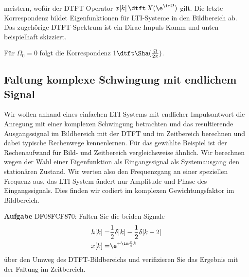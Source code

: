 meistern, wofür der DTFT-Operator $x[k] \,\dtft\, X(\e^{\im\Omega})$ gilt.
%
Die letzte Korrespondenz bildet Eigenfunktionen für LTI-Systeme in den Bildbereich ab.
Das zugehörige DTFT-Spektrum ist ein Dirac Impuls Kamm und unten beispielhaft skizziert.
%
\begin{center}
\end{center}
Für $\Omega_0=0$ folgt die Korrespondenz $1 \dtft \Sha(\frac{\Omega}{2\pi})$.

\newpage
\subsection{Faltung komplexe Schwingung mit endlichem Signal}
\label{sec:DF08FCF870}
\begin{Ziel}
Wir wollen anhand eines einfachen LTI Systems mit endlicher Impulsantwort
die Anregung mit einer komplexen Schwingung betrachten und das resultierende
Ausgangssignal im Bildbereich mit der DTFT und im Zeitbereich berechnen und
dabei typische Rechenwege kennenlernen. Für das gewählte
Beispiel ist der Rechenaufwand für Bild- und Zeitbereich
vergleichsweise ähnlich.
%
Wir berechnen wegen der Wahl einer Eigenfunktion als Eingangssignal
als Systemausgang den stationären Zustand. Wir werten also den Frequenzgang
an einer speziellen Frequenz aus, das LTI System ändert nur Amplitude und Phase
des Eingangssignals. Dies finden wir codiert im komplexen Gewichtungsfaktor
im Bildbereich.
\end{Ziel}
\textbf{Aufgabe} {\tiny DF08FCF870}: Falten Sie die beiden Signale
\begin{align}
h[k] =& \frac{1}{2}\delta[k] - \frac{1}{2}\delta[k-2]\\
x[k] =& \e^{+\im \frac{\pi}{4} k}
\end{align}
über den Umweg des DTFT-Bildbereichs und verifizieren Sie das Ergebnis
mit der Faltung im Zeitbereich.


